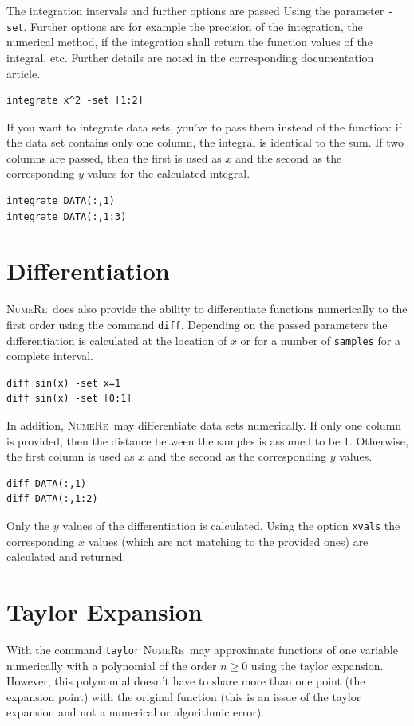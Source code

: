 \documentclass[DIV=14,headsepline,footsepline]{scrbook}
\newcommand{\NR}{\textsc{Nu\-me\-Re}}
\begin{document}
				The integration intervals and further options are passed Using the parameter \lstinline+-set+. Further options are for example the precision of the integration, the numerical method, if the integration shall return the function values of the integral, etc. Further details are noted in the corresponding documentation article.
				\begin{lstlisting}
integrate x^2 -set [1:2]
				\end{lstlisting}
				
				If you want to integrate data sets, you've to pass them instead of the function: if the data set contains only one column, the integral is identical to the sum. If two columns are passed, then the first is used as $x$ and the second as the corresponding $y$ values for the calculated integral.
				\begin{lstlisting}
integrate DATA(:,1)
integrate DATA(:,1:3)
				\end{lstlisting}
				
			\section{Differentiation}
				\NR\ does also provide the ability to differentiate functions numerically to the first order using the command \lstinline+diff+. Depending on the passed parameters the differentiation is calculated at the location of $x$ or for a number of \lstinline+samples+ for a complete interval.
				\begin{lstlisting}
diff sin(x) -set x=1
diff sin(x) -set [0:1]
				\end{lstlisting}
				
				In addition, \NR\ may differentiate data sets numerically. If only one column is provided, then the distance between the samples is assumed to be 1. Otherwise, the first column is used as $x$ and the second as the corresponding $y$ values.
				\begin{lstlisting}
diff DATA(:,1)
diff DATA(:,1:2)
				\end{lstlisting}
				Only the $y$ values of the differentiation is calculated. Using the option \lstinline+xvals+ the corresponding $x$ values (which are not matching to the provided ones) are calculated and returned.
				
			\section{Taylor Expansion}
				With the command \lstinline+taylor+ \NR\ may approximate functions of one variable numerically with a polynomial of the order $n\geq0$ using the taylor expansion. However, this polynomial doesn't have to share more than one point (the expansion point) with the original function (this is an issue of the taylor expansion and not a numerical or algorithmic error).
	
\end{document}
